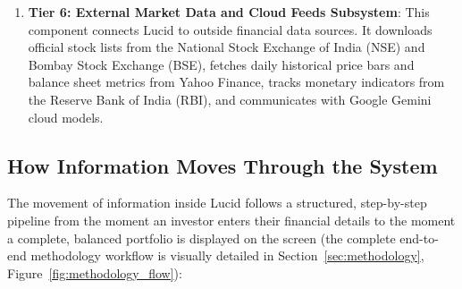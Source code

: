 \begin{enumerate}
    \item \textbf{Tier 6: External Market Data and Cloud Feeds Subsystem}: This component connects Lucid to outside financial data sources. It downloads official stock lists from the National Stock Exchange of India (NSE) and Bombay Stock Exchange (BSE), fetches daily historical price bars and balance sheet metrics from Yahoo Finance, tracks monetary indicators from the Reserve Bank of India (RBI), and communicates with Google Gemini cloud models.
\end{enumerate}

\subsection{How Information Moves Through the System}
The movement of information inside Lucid follows a structured, step-by-step pipeline from the moment an investor enters their financial details to the moment a complete, balanced portfolio is displayed on the screen (the complete end-to-end methodology workflow is visually detailed in Section~\ref{sec:methodology}, Figure~\ref{fig:methodology_flow}):
